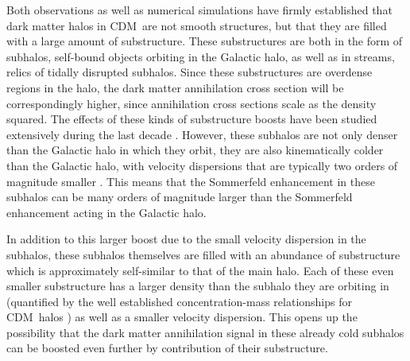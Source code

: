 \documentclass[aps,prd,twocolumn,amsmath,amssymb,floatfix,nofootinbib,10pt]{revtex4}
\newcommand{\CDM}{CDM}
\begin{document}
Both observations
\cite{1994Natur.370..194I,1999Natur.402...53H,2005ApJ...626L..85W,2007ApJ...654..897B,koposov}
as well as numerical simulations
\cite{1998MNRAS.300..146G,johnston98a,1999ApJ...524L..19M,1999ApJ...522...82K,1999MNRAS.307..495H,2003MNRAS.339..834H,2008Natur.454..735D,2008MNRAS.391.1685S}
have firmly established that dark matter halos in \CDM\ are not smooth
structures, but that they are filled with a large amount of
substructure. These substructures are both in the form of subhalos,
self-bound objects orbiting in the Galactic halo, as well as in
streams, relics of tidally disrupted subhalos. Since these
substructures are overdense regions in the halo, the dark matter
annihilation cross section will be correspondingly higher, since
annihilation cross sections scale as the density squared. The effects
of these kinds of substructure boosts have been studied extensively
during the last decade
\cite{2004PhRvD..70b3512B,2004PhRvD..69d3501K,2007ApJ...657..262D,2007PhRvD..75h3526S,2008A&A...479..427L,2008MNRAS.384.1627P,2008ApJ...678..614S,2008ApJ...686..262K,2008Natur.456...73S,2008arXiv0809.2781G}. However,
these subhalos are not only denser than the Galactic halo in which
they orbit, they are also kinematically colder than the Galactic halo,
with velocity dispersions that are typically two orders of magnitude
smaller \cite{1998ARA&A..36..435M,2007ApJ...670..313S}. This means
that the Sommerfeld enhancement in these subhalos can be many orders
of magnitude larger than the Sommerfeld enhancement acting in the
Galactic halo.

In addition to this larger boost due to the small
velocity dispersion in the subhalos, these subhalos themselves are
filled with an abundance of substructure which is approximately
self-similar to that of the main halo. Each of these even smaller
substructure has a larger density than the subhalo they are orbiting
in (quantified by the well established concentration-mass
relationships for \CDM\ halos
\cite{2001MNRAS.321..559B,2001ApJ...554..114E}) as well as a smaller
velocity dispersion. This opens up the possibility that the dark
matter annihilation signal in these already cold subhalos can be
boosted even further by contribution of their substructure. 
\end{document}
